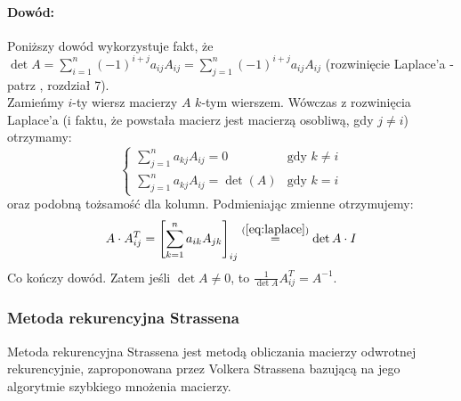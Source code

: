 \documentclass{article}
\begin{document}
\paragraph{Dowód:} Poniższy dowód wykorzystuje fakt, że $\det A = \sum_{i=1}^{n}(-1)^{i+j}a_{ij}A_{ij} = \sum_{j=1}^{n}(-1)^{i+j}a_{ij}A_{ij}$ (rozwinięcie Laplace'a - patrz \cite{hohn2013elementary}, rozdział 7). \\
Zamieńmy $i$-ty wiersz macierzy $A$ $k$-tym wierszem. Wówczas z rozwinięcia Laplace'a (i faktu, że powstała macierz jest macierzą osobliwą, gdy $j \ne i$) otrzymamy:
\begin{equation} \label{eq:laplace}
\begin{cases}
\sum_{j=1}^{n}a_{kj}A_{ij} = 0 & \text{gdy } k \ne i \\
\sum_{j=1}^{n}a_{kj}A_{ij} = \det(A) & \text{gdy } k = i
\end{cases}
\end{equation}
oraz podobną tożsamość dla kolumn. Podmieniając zmienne otrzymujemy:
\begin{equation}
A  \cdot A_{ij}^T = \left[\sum_{k=1}^{n}a_{ik}A_{jk}\right]_{ij} \stackrel{(\ref{eq:laplace})}{=} \det A \cdot I
\end{equation}
Co kończy dowód. Zatem jeśli $\det A \ne 0$, to $\frac{1}{\det A}A_{ij}^{T} = A^{-1}$.

\subsubsection{Metoda rekurencyjna Strassena \label{sec:strassen}}

Metoda rekurencyjna Strassena jest metodą obliczania macierzy odwrotnej rekurencyjnie, zaproponowana przez Volkera Strassena bazującą na jego algorytmie szybkiego mnożenia macierzy.
\end{document}

